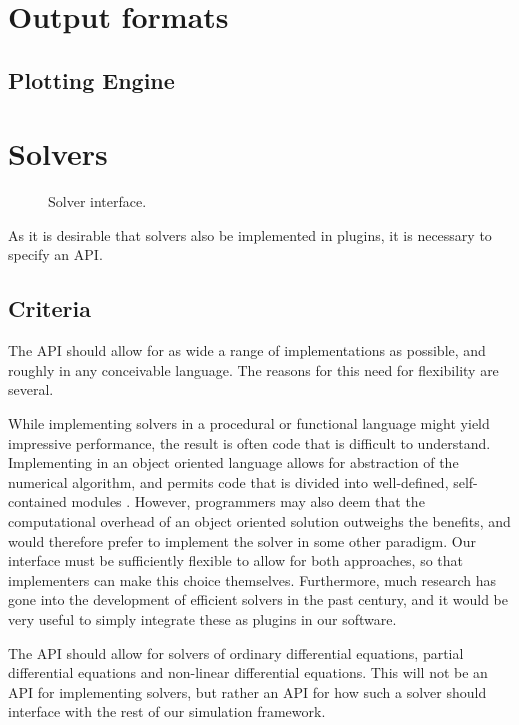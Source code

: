 \documentclass[\rootfolder/main.tex]{subfiles}
\begin{document}
\section{Output formats}

\subsection{Plotting Engine}

\section{Solvers}

\begin{figure}[h]
  \centering
  \caption{Solver interface.\label{fig:solver-interface}}
\end{figure}

As it is desirable that solvers also be implemented in plugins, it is necessary to specify an API.

\subsection{Criteria}

The API should allow for as wide a range of implementations as possible, and roughly in any conceivable language.
The reasons for this need for flexibility are several.

While implementing solvers in a procedural or functional language might yield impressive performance, the result is often code that is difficult to understand.
Implementing in an object oriented language allows for abstraction of the numerical algorithm, and permits code that is divided into well-defined, self-contained modules \cite{kees1999}.
However, programmers may also deem that the computational overhead of an object oriented solution outweighs the benefits, and would therefore prefer to implement the solver in some other paradigm.
Our interface must be sufficiently flexible to allow for both approaches, so that implementers can make this choice themselves.
Furthermore, much research has gone into the development of efficient solvers in the past century, and it would be very useful to simply integrate these as plugins in our software.

The API should allow for solvers of ordinary differential equations, partial differential equations and non-linear differential equations.
This will not be an API for implementing solvers, but rather an API for how such a solver should interface with the rest of our simulation framework.
\end{document}
